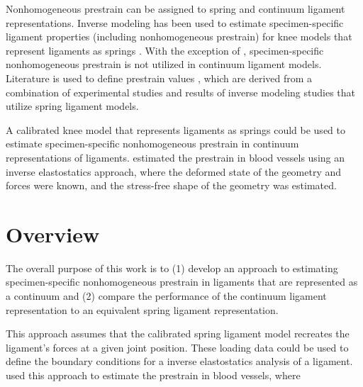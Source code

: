 Nonhomogeneous prestrain can be assigned to spring and continuum ligament representations. Inverse modeling has been used to estimate specimen-specific ligament properties (including nonhomogeneous prestrain) for knee models that represent ligaments as springs \citep{blankevoort_validation_1996,baldwin_efficient_2009,ewing_estimating_2015,harris_combined_2016}. With the exception of \cite{gardiner_subject-specific_2003}, specimen-specific nonhomogeneous prestrain is not utilized in continuum ligament models. Literature is used to define prestrain values \citep{pena_three-dimensional_2006,dhaher_effect_2010}, which are derived from a combination of experimental studies and results of inverse modeling studies that utilize spring ligament models.

A calibrated knee model that represents ligaments as springs could be used to estimate specimen-specific nonhomogeneous prestrain in continuum representations of ligaments. \cite{lu_computational_2007} estimated the prestrain in blood vessels using an inverse elastostatics approach, where the deformed state of the geometry and forces were known, and the stress-free shape of the geometry was estimated. 

\section{Overview}
The overall purpose of this work is to (1) develop an approach to estimating specimen-specific nonhomogeneous prestrain in ligaments that are represented as a continuum and (2) compare the performance of the continuum ligament representation to an equivalent spring ligament representation.

This approach assumes that the calibrated spring ligament model recreates the ligament's forces at a given joint position. These loading data could be used to define the boundary conditions for a inverse elastostatics analysis of a ligament. \cite{lu_computational_2007} used this approach to estimate the prestrain in blood vessels, where 

